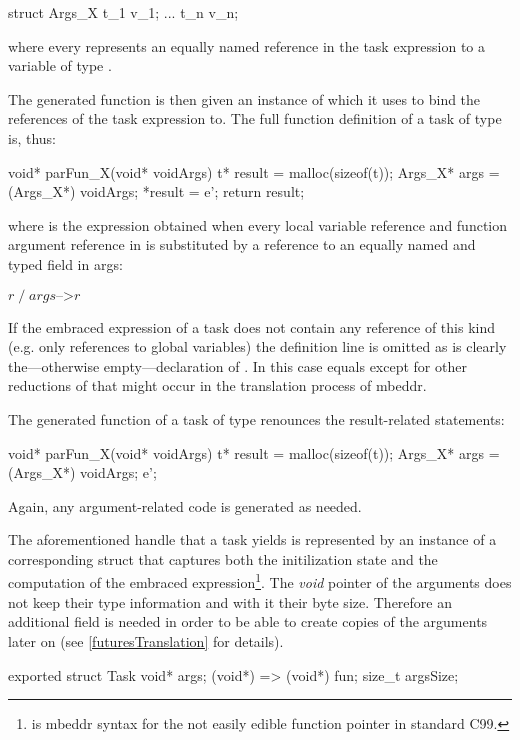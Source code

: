 \begin{ccode}
struct Args_X {
  t_1 v_1;
  ...
  t_n v_n;
}
\end{ccode}

where every  represents an equally named reference in the task expression to a variable of type .

The generated function  is then given an instance of  which it uses to bind the references of the task expression to. The full function definition of a task  of type  is, thus:

\begin{ccode}
void* parFun_X(void* voidArgs) {
  t* result = malloc(sizeof(t));
  Args_X* args = (Args_X*) voidArgs;
  *result = e';
  return result;
}
\end{ccode}

where  is the expression obtained when every local variable reference and function argument reference  in  is substituted by a reference to an equally named and typed field in args:

$r\;/\;args\text{-->}r$

If the embraced expression of a task does not contain any reference of this kind (e.g. only references to global variables) the  definition line is omitted as is clearly the---otherwise empty---declaration of . In this case  equals  except for other reductions of  that might occur in the translation process of mbeddr.

The generated function of a task of type  renounces the result-related statements:

\begin{ccode}
void* parFun_X(void* voidArgs) {
  t* result = malloc(sizeof(t));
  Args_X* args = (Args_X*) voidArgs;
  e';
}
\end{ccode}

Again, any argument-related code is generated as needed.

The aforementioned handle that a task yields is represented by an instance of a corresponding struct that captures both the initilization state and the computation of the embraced expression\footnote{ is mbeddr syntax for the not easily edible function pointer  in standard C99.}. The \textit{void} pointer of the arguments  does not keep their type information and with it their byte size. Therefore an additional field  is needed in order to be able to create copies of the arguments later on (see \ref{futuresTranslation} for details).
\begin{ccode}
exported struct Task {
  void* args;
  (void*) => (void*) fun;
  size_t argsSize;
}
\end{ccode}

